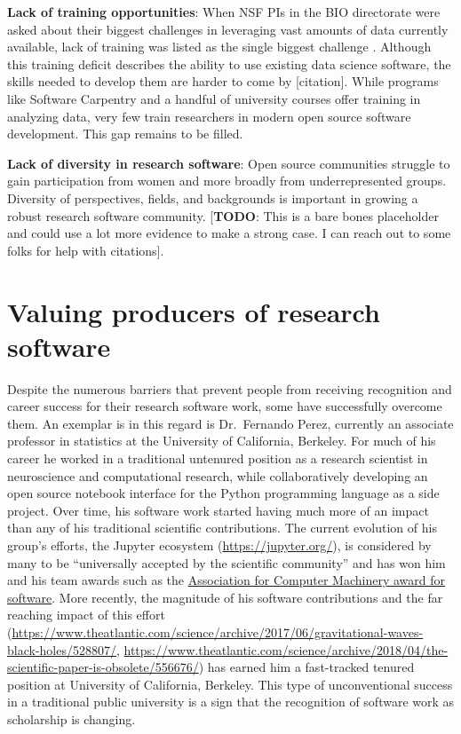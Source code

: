 \documentclass[
]{book}
\begin{document}
\textbf{Lack of training opportunities}: When NSF PIs in the BIO directorate were asked about
their biggest challenges in leveraging vast amounts of data currently available, lack of
training was listed as the single biggest challenge \citep{barone2017unmet}. Although this
training deficit describes the ability to use existing data science software, the skills
needed to develop them are harder to come by {[}citation{]}. While programs like Software
Carpentry and a handful of university courses offer training in analyzing data, very few
train researchers in modern open source software development. This gap remains to be filled.

\textbf{Lack of diversity in research software}: Open source communities struggle to gain
participation from women and more broadly from underrepresented groups. Diversity of
perspectives, ﬁelds, and backgrounds is important in growing a robust research software
community. {[}\textbf{TODO}: This is a bare bones placeholder and could use a lot more evidence
to make a strong case. I can reach out to some folks for help with citations{]}.

\hypertarget{valuing-producers-of-research-software}{%
\section{Valuing producers of research software}\label{valuing-producers-of-research-software}}

Despite the numerous barriers that prevent people from receiving recognition and career
success for their research software work, some have successfully overcome them. An exemplar
is in this regard is Dr.~Fernando Perez, currently an associate professor in statistics at
the University of California, Berkeley. For much of his career he worked in a traditional
untenured position as a research scientist in neuroscience and computational research,
while collaboratively developing an open source notebook interface for the Python programming
language as a side project. Over time, his software work started having much more of an
impact than any of his traditional scientific contributions. The current evolution of his
group's efforts, the Jupyter ecosystem (\url{https://jupyter.org/}), is
considered by many to be ``universally accepted by the scientific community'' and has won
him and his team awards such as the \href{https://blog.jupyter.org/jupyter-receives-the-acm-software-system-award-d433b0dfe3a2}{Association for Computer Machinery award for software}.
More recently, the magnitude of his software contributions and the far reaching impact of
this effort (\url{https://www.theatlantic.com/science/archive/2017/06/gravitational-waves-black-holes/528807/},
\url{https://www.theatlantic.com/science/archive/2018/04/the-scientific-paper-is-obsolete/556676/})
has earned him a fast-tracked tenured position at University of California, Berkeley.
This type of unconventional success in a traditional public university is a sign that
the recognition of software work as scholarship is changing.
\end{document}
